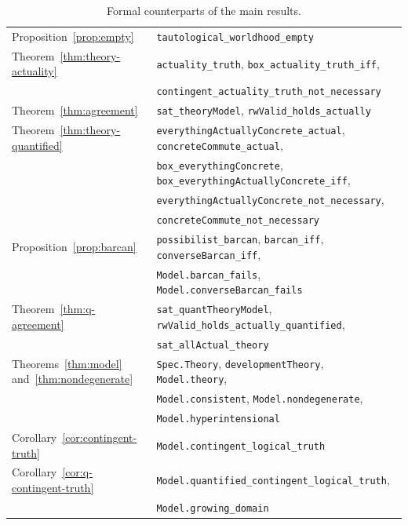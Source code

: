 \documentclass[11pt]{amsart}
\theoremstyle{plain}
\theoremstyle{definition}
\theoremstyle{remark}
\begin{document}
\begin{table}[ht]
\begin{tabular}{@{}ll@{}}
Proposition~\ref{prop:empty} & \texttt{tautological\_worldhood\_empty} \\
Theorem~\ref{thm:theory-actuality} & \texttt{actuality\_truth}, \texttt{box\_actuality\_truth\_iff}, \\
 & \texttt{contingent\_actuality\_truth\_not\_necessary} \\
Theorem~\ref{thm:agreement} & \texttt{sat\_theoryModel}, \texttt{rwValid\_holds\_actually} \\
Theorem~\ref{thm:theory-quantified} & \texttt{everythingActuallyConcrete\_actual}, \texttt{concreteCommute\_actual}, \\
 & \texttt{box\_everythingConcrete}, \texttt{box\_everythingActuallyConcrete\_iff}, \\
 & \texttt{everythingActuallyConcrete\_not\_necessary}, \\
 & \texttt{concreteCommute\_not\_necessary} \\
Proposition~\ref{prop:barcan} & \texttt{possibilist\_barcan}, \texttt{barcan\_iff}, \texttt{converseBarcan\_iff}, \\
 & \texttt{Model.barcan\_fails}, \texttt{Model.converseBarcan\_fails} \\
Theorem~\ref{thm:q-agreement} & \texttt{sat\_quantTheoryModel}, \texttt{rwValid\_holds\_actually\_quantified}, \\
 & \texttt{sat\_allActual\_theory} \\
Theorems~\ref{thm:model} and~\ref{thm:nondegenerate} & \texttt{Spec.Theory}, \texttt{developmentTheory}, \texttt{Model.theory}, \\
 & \texttt{Model.consistent}, \texttt{Model.nondegenerate}, \\
 & \texttt{Model.hyperintensional} \\
Corollary~\ref{cor:contingent-truth} & \texttt{Model.contingent\_logical\_truth} \\
Corollary~\ref{cor:q-contingent-truth} & \texttt{Model.quantified\_contingent\_logical\_truth}, \\
 & \texttt{Model.growing\_domain} \\
\bottomrule
\end{tabular}
\caption{Formal counterparts of the main results.}
\label{tab:mech}
\end{table}



\end{document}
